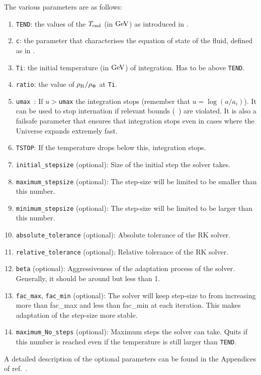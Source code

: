 \documentclass[11pt,a4paper]{article}
\begin{document}
The various parameters are as follows:
%
\begin{enumerate}
	\item {\tt TEND}: the values of the $T_{\rm end}{}$ (in ${\rm GeV}$) as introduced in . 
	
	\item {\tt c}: the parameter that characterises the equation of state of the fluid, defined as in .
	
	\item {\tt Ti}: the initial temperature (in ${\rm GeV}$) of integration. Has to be above {\tt TEND}.
	
	\item {\tt ratio}: the value of $\rho_{\rm R}/\rho_{\Phi}$ at {\tt Ti}. 
	
	\item {\tt umax }: If $u>${\tt umax} the integration stops (remember that $u=\log(a/a_i)$). It can be used to stop internation if relevant bounds (\eg~\cite{Planck:2018jri}) are violated. It is also a failsafe parameter that ensures that integration stops even in cases where the Universe expands extremely fast.
	
	\item {\tt TSTOP}: If the temperature drops below this, integration stops. 
	
	\item {\tt initial\_stepsize} (optional): Size of the initial step the solver takes. 
	
	\item {\tt maximum\_stepsize} (optional): The step-size will be limited to be smaller than this number. 
	
	\item {\tt minimum\_stepsize} (optional): The step-size will be limited to be larger than this number. 
	
	\item {\tt absolute\_tolerance} (optional): Absolute tolerance of the RK solver.
	
	\item {\tt relative\_tolerance} (optional): Relative tolerance of the RK solver.
	
	\item {\tt beta} (optional): Aggressiveness of the adaptation process of the solver. Generally, it should be around but less than 1.
	
	\item {\tt fac\_max},  {\tt fac\_min} (optional): The solver will keep step-size to from increasing more than fac\_max and less than fac\_min at each iteration. This makes adaptation of the step-size more stable.
	
	\item {\tt maximum\_No\_steps} (optional): Maximum steps the solver can take. Quits if this number is reached even if the temperature is still larger than {\tt TEND}. 
\end{enumerate}
%
A detailed description of the optional parameters can be found in the Appendices of ref.~\cite{Karamitros:2021nxi}.
\end{document}

